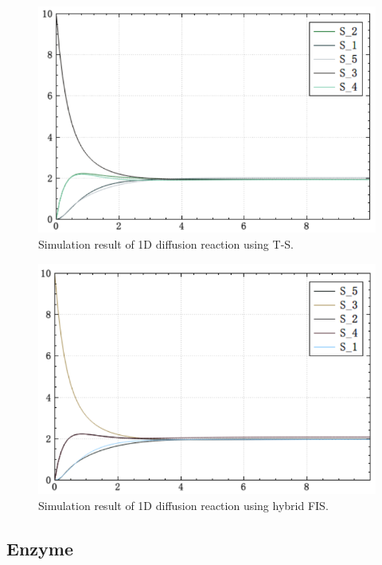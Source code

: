\documentclass[journal,a4paper,onecolumn]{article}
\begin{document}
\begin{figure}[!hbt]
	\begin{center}
		\includegraphics[width=\columnwidth]{fig23}
		\caption{Simulation result of 1D diffusion reaction using T-S.}
		\label{fig:Simulation result of 1D diffusion reaction using T-S.}
	\end{center}
\end{figure}
\begin{figure}[!hbt]
	\begin{center}
		\includegraphics[width=\columnwidth]{fig24}
		\caption{Simulation result of 1D diffusion reaction using hybrid FIS.}
		\label{fig:Simulation result of 1D diffusion reaction using hybrid FIS.}
	\end{center}
\end{figure}

\clearpage
\subsection{Enzyme}
\end{document}
